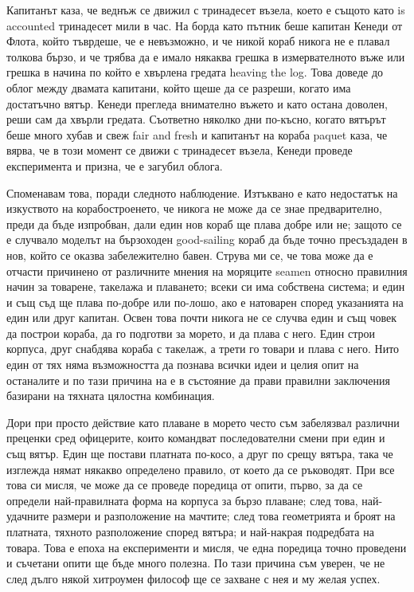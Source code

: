 \documentclass[12pt]{book}
\begin{document}
Капитанът каза, че веднъж се движил с тринадесет възела, което е същото като is accounted тринадесет мили в час. На борда като пътник беше капитан Кенеди от Флота, който тъврдеше, че е невъзможно, и че никой кораб никога не е плавал толкова бързо, и че трябва да е имало някаква грешка в измервателното въже или грешка в начина по който е хвърлена гредата heaving the log. Това доведе до облог между двамата капитани, който щеше да се разреши, когато има достатъчно вятър. Кенеди прегледа внимателно въжето и като остана доволен, реши сам да хвърли гредата. Съответно няколко дни по-късно, когато вятърът беше много хубав и свеж fair and fresh и капитанът на кораба paquet каза, че вярва, че в този момент се движи с тринадесет възела, Кенеди проведе експеримента и призна, че е загубил облога.

Споменавам това, поради следното наблюдение. Изтъквано е като недостатък на изкуството на корабостроенето, че никога не може да се знае предварително, преди да бъде изпробван, дали един нов кораб ще плава добре или не; защото се е случвало моделът на бързоходен good-sailing кораб да бъде точно пресъздаден в нов, който се оказва забележително бавен. Струва ми се, че това може да е отчасти причинено от различните мнения на моряците seamen относно правилния начин за товарене, такелажа и плаването; всеки си има собствена система; и един и същ съд ще плава по-добре или по-лошо, ако е натоварен според указанията на един или друг капитан. Освен това почти никога не се случва един и същ човек да построи кораба, да го подготви за морето, и да плава с него. Един строи  корпуса, друг снабдява кораба с такелаж, а трети го товари и плава с него. Нито един от тях няма възможността да познава всички идеи и целия опит на останалите и по тази причина на е в състояние да прави правилни заключения базирани на тяхната цялостна комбинация. 

Дори при просто действие като плаване в морето често съм забелязвал различни преценки сред офицерите, които командват последователни смени при един и същ вятър. Един ще постави платната по-косо, а друг по срещу вятъра, така че изглежда нямат някакво определено правило, от което да се ръководят. При все това си мисля, че може да се проведе поредица от опити, първо, за да се определи най-правилната форма на корпуса за бързо плаване; след това, най-удачните размери и разположение на мачтите; след това геометрията и броят на платната, тяхното разположение според вятъра; и най-накрая подредбата на товара. Това е епоха на експерименти и мисля, че една поредица точно проведени и съчетани опити ще бъде много полезна. По тази причина съм уверен, че не след дълго някой хитроумен философ ще се захване с нея и му желая успех.
\end{document}
